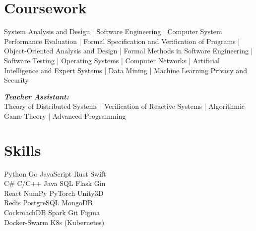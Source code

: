 \documentclass[letterpaper]{deedy-resume} %
\begin{document}
\begin{minipage}[t]{0.33\textwidth}
\sectionspace %


%
%


\section{Coursework}
System Analysis and Design |
Software Engineering |
Computer System Performance Evaluation |
Formal Specification and Verification of Programs |
Object-Oriented Analysis and Design |
Formal Methods in Software Engineering |
Software Testing |
Operating Systems |
Computer Networks |
Artificial Intelligence and Expert Systems |
Data Mining | Machine Learning Privacy and Security

{\footnotesize \textit{\textbf{Teacher Assistant: }}} \\

Theory of Distributed Systems |
Verification of Reactive Systems |
Algorithmic Game Theory |
Advanced Programming

\sectionspace %


\section{Skills}
Python \textbullet{} Go \textbullet{} JavaScript \textbullet{} Rust \textbullet{} Swift \\ %
C\# \textbullet{} C/C++ \textbullet{} Java \textbullet{} SQL \textbullet{} Flask \textbullet{} Gin \\ %
React \textbullet{} NumPy \textbullet{} PyTorch \textbullet{} Unity3D \\ %
Redis \textbullet{} PostgreSQL \textbullet{} MongoDB \\ %
CockroachDB \textbullet{} Spark \textbullet{} Git \textbullet{} Figma  \\ %
Docker-Swarm \textbullet{} K8s (Kubernetes) 
\sectionspace %


\end{minipage} %
\end{document}
